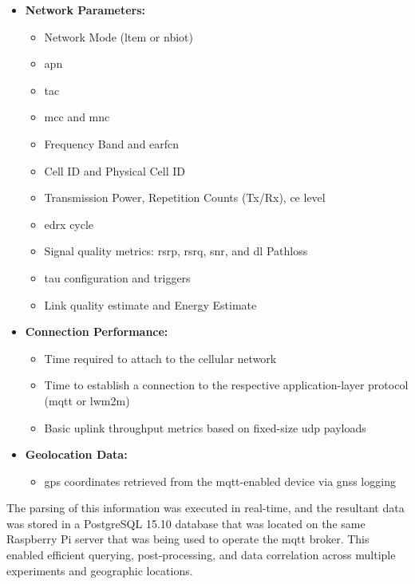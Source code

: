 \documentclass[12pt, english, openany]{book}
\begin{document}
\begin{itemize}
    \item \textbf{Network Parameters:}
          \begin{itemize}
              \item Network Mode (\gls{ltem} or \gls{nbiot})
              \item \gls{apn}
              \item \gls{tac}
              \item \gls{mcc} and \gls{mnc}
              \item Frequency Band and \gls{earfcn}
              \item Cell ID and Physical Cell ID
              \item Transmission Power, Repetition Counts (Tx/Rx), \gls{ce} level
              \item \gls{edrx} cycle
              \item Signal quality metrics: \gls{rsrp}, \gls{rsrq}, \gls{snr}, and \gls{dl} Pathloss
              \item \gls{tau} configuration and triggers
              \item Link quality estimate and Energy Estimate
          \end{itemize}

    \item \textbf{Connection Performance:}
          \begin{itemize}
              \item Time required to attach to the cellular network
              \item Time to establish a connection to the respective application-layer protocol (\gls{mqtt} or \gls{lwm2m})
              \item Basic uplink throughput metrics based on fixed-size \gls{udp} payloads
          \end{itemize}

    \item \textbf{Geolocation Data:}
          \begin{itemize}
              \item \gls{gps} coordinates retrieved from the \gls{mqtt}-enabled device via \gls{gnss} logging
          \end{itemize}
\end{itemize}

The parsing of this information was executed in real-time, and the resultant data was stored in a PostgreSQL 15.10 database that was located on the same Raspberry Pi server that was being used to operate the \gls{mqtt} broker. This enabled efficient querying, post-processing, and data correlation across multiple experiments and geographic locations.
\end{document}
